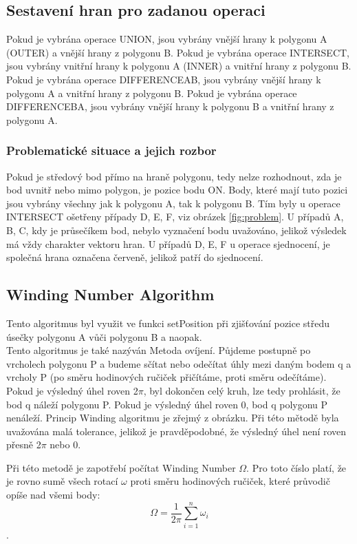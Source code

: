 \documentclass[a4paper,11pt,twoside]{article}
\begin{document}
\newpage
\vspace*{-1cm}
\subsection{Sestavení hran pro zadanou operaci}
Pokud je vybrána operace UNION, jsou vybrány vnější hrany k polygonu A (OUTER) a vnější hrany z polygonu B.
Pokud je vybrána operace INTERSECT, jsou vybrány vnitřní hrany k polygonu A (INNER) a vnitřní hrany z polygonu B.
Pokud je vybrána operace DIFFERENCEAB, jsou vybrány vnější hrany k polygonu A a vnitřní hrany z polygonu B.
Pokud je vybrána operace DIFFERENCEBA, jsou vybrány vnější hrany k polygonu B a vnitřní hrany z polygonu A.

\subsubsection{Problematické situace a jejich rozbor}
 Pokud je středový bod přímo na hraně polygonu, tedy nelze rozhodnout, zda je bod uvnitř nebo mimo polygon, je pozice bodu ON. Body, které mají tuto pozici jsou vybrány všechny jak k polygonu A, tak k polygonu B. Tím byly u operace INTERSECT ošetřeny případy D, E, F, viz obrázek \ref{fig:problem}. U případů A, B, C, kdy je průsečíkem bod, nebylo vyznačení bodu uvažováno, jelikož výsledek má vždy charakter vektoru hran. U případů D, E, F u operace sjednocení, je společná hrana označena červeně, jelikož patří do sjednocení.

\subsection{Winding Number Algorithm}
\large
\noindent Tento algoritmus byl využit ve funkci setPosition při zjišťování pozice středu úsečky polygonu A vůči polygonu B a naopak.
\\
\noindent Tento algoritmus je také nazýván Metoda ovíjení. Půjdeme postupně po vrcholech polygonu P a budeme sčítat nebo odečítat úhly mezi daným bodem q a vrcholy P (po směru hodinových ručiček přičítáme, proti směru odečítáme). Pokud je výsledný úhel roven 2$\pi$, byl dokončen celý kruh, lze tedy prohlásit, že bod q náleží polygonu P. Pokud je výsledný úhel roven 0, bod q polygonu P nenáleží. Princip Winding algoritmu je zřejmý z obrázku. Při této mětodě byla uvažována malá tolerance, jelikož je pravděpodobné, že výsledný úhel není roven přesně 2$\pi$ nebo 0.

\noindent Při této metodě je zapotřebí počítat Winding Number $\Omega$. Pro toto číslo platí, že je rovno sumě všech rotací $\omega$ proti směru hodinových ručiček, které průvodič opíše nad všemi body: 
$$ 
\Omega = \frac{1}{2\pi} \sum_{i=1}^n \omega_i
$$.
\end{document}
